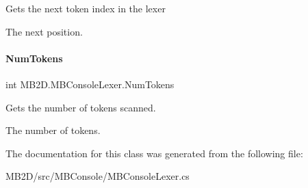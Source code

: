 Gets the next token index in the lexer 

The next position.\hypertarget{class_m_b2_d_1_1_m_b_console_lexer_ae91f360dd9246d226468c79f7322413f}{}\label{class_m_b2_d_1_1_m_b_console_lexer_ae91f360dd9246d226468c79f7322413f} 
\paragraph{\texorpdfstring{Num\+Tokens}{NumTokens}}
{\footnotesize\ttfamily int M\+B2\+D.\+M\+B\+Console\+Lexer.\+Num\+Tokens\hspace{0.3cm}{\ttfamily [get]}}



Gets the number of tokens scanned. 

The number of tokens.

The documentation for this class was generated from the following file\+:\begin{DoxyCompactItemize}
\item 
M\+B2\+D/src/\+M\+B\+Console/M\+B\+Console\+Lexer.\+cs\end{DoxyCompactItemize}
